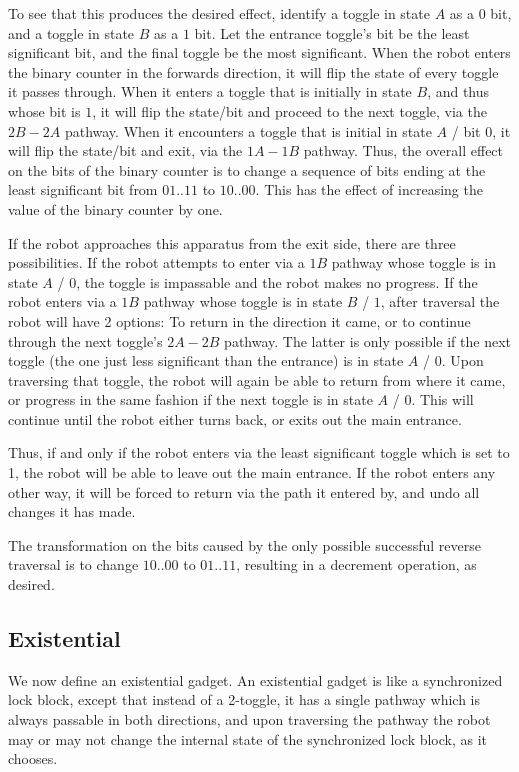 \documentclass[11pt]{article}
\begin{document}
To see that this produces the desired effect, identify a toggle in state $A$ as a $0$ bit, and a toggle in state
$B$ as a $1$ bit. Let the entrance toggle's bit be the least significant bit, and the final toggle be the
most significant. When the robot enters the binary counter in the forwards direction, it will flip
the state of every toggle it passes through. When it enters a toggle that is initially in state $B$, and thus whose
bit is $1$, it will flip the state/bit and proceed to the next toggle, via the $2B - 2A$ pathway. When it
encounters a toggle that is initial in state $A$ / bit $0$, it will flip the state/bit and exit, via the $1A - 1B$
pathway. Thus, the overall effect on the bits of the binary counter is to change a sequence of bits ending at the
least significant bit from $01..11$ to $10..00$. This has the effect of increasing the value of the binary counter
by one.

If the robot approaches this apparatus from the exit side, there are three possibilities. If the robot attempts
to enter via a $1B$ pathway whose toggle is in state $A$ / $0$, the toggle is impassable and the robot makes
no progress. If the robot enters via a $1B$ pathway whose toggle is in state $B$ / $1$, after traversal the
robot will have 2 options: To return in the direction it came, or to continue through the next toggle's
$2A -2B$ pathway. The latter is only possible if the next toggle
(the one just less significant than the entrance) is
in state $A$ / $0$. Upon traversing that toggle, the robot will again be able to return from where it came, or
progress in the same fashion if the next toggle is in state $A$ / $0$. This will continue until the robot
either turns back, or exits out the main entrance.

Thus, if and only if the robot enters via the least significant toggle which is set to 1, the robot will be
able to leave out the main entrance. If the robot enters any other way, it will be forced to return via the
path it entered by, and undo all changes it has made.

The transformation on the bits caused by the only possible successful reverse traversal is to change $10 .. 00$
to $01 .. 11$, resulting in a decrement operation, as desired.

\subsection{Existential}
We now define an existential gadget. An existential gadget is like a synchronized lock block, except that instead of a
2-toggle, it has a single pathway which is always passable in both directions, and upon traversing the pathway
the robot may or may not change the internal state of the synchronized lock block, as it chooses.
\end{document}
